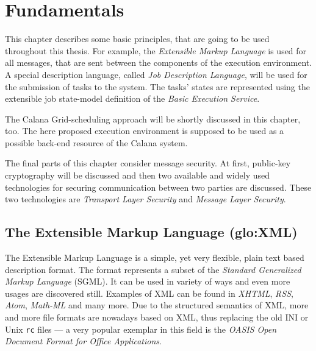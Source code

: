 
\chapter{Fundamentals}
\label{cha:fundamentals}

This chapter  describes some basic principles,  that are going  to be used
throughout this thesis. For example, the \emph{Extensible Markup Language}
is used  for all  messages, that  are sent between  the components  of the
execution  environment. A special  description language,  called \emph{Job
  Description Language}, will  be used for the submission  of tasks to the
system.   The  tasks' states  are  represented  using  the extensible  job
state-model definition of the \emph{Basic Execution Service}.

The  Calana Grid-scheduling  approach will  be shortly  discussed  in this
chapter, too.  The here proposed  execution environment is supposed  to be
used as a possible back-end resource of the Calana system.

The  final parts  of this  chapter  consider message  security. At  first,
public-key  cryptography will  be  discussed and  then  two available  and
widely used  technologies for  securing communication between  two parties
are discussed. These two  technologies are \emph{Transport Layer Security}
and \emph{Message Layer Security}.

\section[The Extensible Markup Language]
{The Extensible Markup Language (\gls{glo:XML})}
\label{sec:fundamentals:xml}

The Extensible Markup Language \cite{xml}  is a simple, yet very flexible,
plain text based description format. The format represents a subset of the
\emph{Standard  Generalized Markup Language}  (SGML).  It  can be  used in
variety of ways and even more usages are discovered still. Examples of XML
can be found in  \emph{XHTML}, \emph{RSS}, \emph{Atom}, \emph{Math-ML} and
many more.   Due to the  structured semantics of  XML, more and  more file
formats are  nowadays based  on XML,  thus replacing the  old INI  or Unix
\texttt{rc}  files  --- a  very  popular exemplar  in  this  field is  the
\emph{OASIS Open Document Format for Office Applications}.

